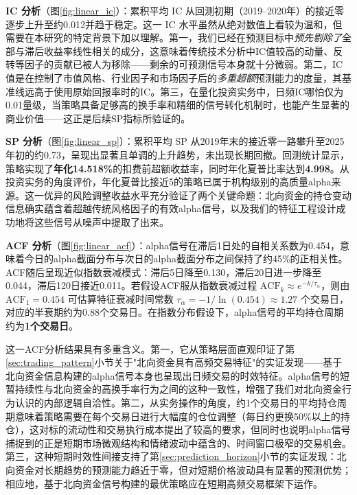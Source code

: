 \documentclass{article}
\begin{document}
\textbf{IC 分析}（图\ref{fig:linear_ic}）：累积平均 IC 从回测初期（2019--2020年）的接近零逐步上升至约0.012并趋于稳定。这一 IC 水平虽然从绝对数值上看较为温和，但需要在本研究的特定背景下加以理解。第一，我们已经在预测目标中\textit{预先剔除了}全部与滞后收益率线性相关的成分，这意味着传统技术分析中IC值较高的动量、反转等因子的贡献已被人为移除——剩余的可预测信号本身就十分微弱。第二，IC 值是在控制了市值风格、行业因子和市场因子后的\textit{多重超额}预测能力的度量，其基准线远高于使用原始回报率时的IC。第三，在量化投资实务中，日频IC哪怕仅为0.01量级，当策略具备足够高的换手率和精细的信号转化机制时，也能产生显著的商业价值——这正是后续SP指标所验证的。

\textbf{SP 分析}（图\ref{fig:linear_sp}）：累积平均 SP 从2019年末的接近零一路攀升至2025年初的约0.73，呈现出显著且单调的上升趋势，未出现长期回撤。回测统计显示，策略实现了\textbf{年化14.518\%}的扣费前超额收益率，同时年化夏普比率达到\textbf{4.998}。从投资实务的角度评价，年化夏普比接近5的策略已属于机构级别的高质量alpha来源。这一优异的风险调整收益水平充分验证了两个关键命题：北向资金的持仓变动信息确实蕴含着超越传统风格因子的有效alpha信号，以及我们的特征工程设计成功地将这些信号从噪声中提取了出来。

\textbf{ACF 分析}（图\ref{fig:linear_acf}）：alpha信号在滞后1日处的自相关系数为0.454，意味着今日的alpha截面分布与次日的alpha截面分布之间保持了约45\%的正相关性。ACF随后呈现近似指数衰减模式：滞后5日降至0.130，滞后20日进一步降至0.044，滞后120日接近0.011。若假设ACF服从指数衰减过程 $\text{ACF}_k \approx e^{-k/\tau_{\alpha}}$，则由 $\text{ACF}_1 = 0.454$ 可估算特征衰减时间常数 $\tau_{\alpha} = -1/\ln(0.454) \approx 1.27$ 个交易日，对应的半衰期约为0.88个交易日。在指数分布假设下，alpha信号的平均持仓周期约为\textbf{1个交易日}。

这一ACF分析结果具有多重含义。第一，它从策略层面直观印证了第\ref{sec:trading_pattern}小节关于"北向资金具有高频交易特征"的实证发现——基于北向资金信息构建的alpha信号本身也呈现出日频交易的时效特征。alpha信号的短暂持续性与北向资金的高换手率行为之间的这种一致性，增强了我们对北向资金行为认识的内部逻辑自洽性。第二，从实务操作的角度，约1个交易日的平均持仓周期意味着策略需要在每个交易日进行大幅度的仓位调整（每日约更换50\%以上的持仓），这对标的流动性和交易执行成本提出了较高的要求，但同时也说明alpha信号捕捉到的正是短期市场微观结构和情绪波动中蕴含的、时间窗口极窄的交易机会。第三，这种短期时效性间接支持了第\ref{sec:prediction_horizon}小节的实证发现：北向资金对长期趋势的预测能力趋近于零，但对短期价格波动具有显著的预测优势；相应地，基于北向资金信号构建的最优策略应在短期高频交易框架下运作。
\end{document}
